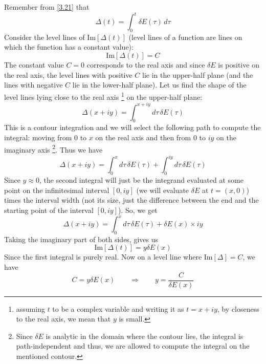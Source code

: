 \documentclass[12pt,a4paper]{article}
\begin{document}
	Remember from \eqref{3.21} that
	\begin{equation}
		\Delta (t) = \int_{0}^{t} \delta E (\tau) \, d\tau
		\label{3.33}
	\end{equation}
	Consider the level lines of $\mathrm{Im} [\Delta(t)]$ (level lines of a function are lines on which the function has a constant value):
	\begin{equation}
		\mathrm{Im} [\Delta(t)] = C
	\end{equation}
	The constant value $C = 0$ corresponds to the real axis and since $\delta E$ is positive on the real axis, the level lines with positive $C$ lie in the upper-half plane (and the lines with negative $C$ lie in the lower-half plane). Let us find the shape of the level lines lying close to the real axis \footnote{assuming $t$ to be a complex variable and writing it as $t = x + iy$, by closeness to the real axis, we mean that $y$ is small.} on the upper-half plane:
	\begin{equation}
		\Delta (x + iy) = \int_{0}^{x + iy} d\tau \, \delta E(\tau)
	\end{equation}
	This is a contour integration and we will select the following path to compute the integral: moving from $0$ to $x$ on the real axis and then from $0$ to $iy$ on the imaginary axis \footnote{Since $\delta E$ is analytic in the domain where the contour lies, the integral is path-independent and thus, we are allowed to compute the integral on the mentioned contour.}. Thus we have
	\begin{equation}
		\Delta (x + iy) = \int_{0}^{x} d\tau \, \delta E(\tau) + \int_{0}^{iy} d\tau \, \delta E(\tau)
	\end{equation}
	Since $y \approx 0$, the second integral will just be the integrand evaluated at some point on the infinitesimal interval $[0, iy]$ (we will evaluate $\delta E$ at $t = (x, 0)$) times the interval width (not its size, just the difference between the end and the starting point of the interval $[0, iy]$). So, we get
	\begin{equation}
		\Delta (x + iy) = \int_{0}^{x} d\tau \, \delta E(\tau) + \delta E(x) \times iy
	\end{equation}
	Taking the imaginary part of both sides, gives us
	\begin{equation}
		\mathrm{Im}[\Delta(t)] = y \delta E(x)
 	\end{equation}
 	Since the first integral is purely real. Now on a level line where $\mathrm{Im} [\Delta] = C$, we have
 	\begin{equation}
 		C = y \delta E(x) \qquad \Rightarrow \qquad y = \dfrac{C}{\delta E(x)}
 	\end{equation}
\end{document}
